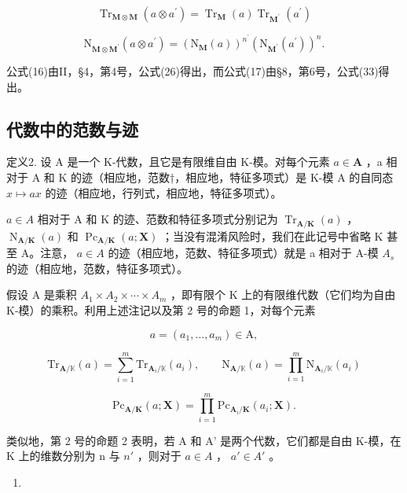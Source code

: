 \[
\operatorname{Tr} _ {\mathbf {M} \otimes \mathbf {M}} (a \otimes a ^ {\prime}) = \operatorname{Tr} _ {\mathbf {M}} (a) \operatorname{Tr} _ {\mathbf {M} ^ {\prime}} (a ^ {\prime})\tag{17}
\]

\[
\mathrm{N} _ {\mathbf {M} \otimes \mathbf {M} ^ {\prime}} (a \otimes a ^ {\prime}) = (\mathrm{N} _ {\mathbf {M}} (a)) ^ {n ^ {\prime}} (\mathrm{N} _ {\mathbf {M} ^ {\prime}} (a ^ {\prime})) ^ {n}.
\]

公式(16)由II，§4，第4号，公式(26)得出，而公式(17)由§8，第6号，公式(33)得出。

\subsection{代数中的范数与迹}

定义2. 设 A 是一个 K-代数，且它是有限维自由 K-模。对每个元素 \(a \in \mathbf{A}\) ，a 相对于 A 和 K 的迹（相应地，范数†，相应地，特征多项式）是 K-模 A 的自同态 \(x \mapsto ax\) 的迹（相应地，行列式，相应地，特征多项式）。

 \(a \in A\) 相对于 A 和 K 的迹、范数和特征多项式分别记为 \(\operatorname{Tr}_{\mathbf{A}/\mathbf{K}}(a)\) ， \(\operatorname{N}_{\mathbf{A}/\mathbf{K}}(a)\) 和 \(\operatorname{Pc}_{\mathbf{A}/\mathbf{K}}(a; \mathbf{X})\) ；当没有混淆风险时，我们在此记号中省略 K 甚至 A。注意， \(a \in A\) 的迹（相应地，范数、特征多项式）就是 a 相对于 A-模 \(A_{s}\) 的迹（相应地，范数，特征多项式）。

假设 A 是乘积 \(A_{1} \times A_{2} \times \cdots \times A_{m}\) ，即有限个 K 上的有限维代数（它们均为自由 K-模）的乘积。利用上述注记以及第 2 号的命题 1，对每个元素

\[
a = (a _ {1}, \dots , a _ {m}) \in \mathrm{A},
\]

\[
\mathrm{Tr} _ {\mathbf {A} / \mathbb {K}} (a) = \sum_ {i = 1} ^ {m} \mathrm{Tr} _ {\mathbf {A} _ {i} / \mathbb {K}} (a _ {i}), \qquad \mathrm{N} _ {\mathbf {A} / \mathbb {K}} (a) = \prod_ {i = 1} ^ {m} \mathrm{N} _ {\mathbf {A} _ {i} / \mathbb {K}} (a _ {i})\tag{18}
\]

\[
\mathrm{Pc} _ {\mathbf {A} / \mathbf {K}} (a; \mathbf {X}) = \prod_ {i = 1} ^ {m} \mathrm{Pc} _ {\mathbf {A} _ {i} / \mathbf {K}} (a _ {i}; \mathbf {X}).
\]

类似地，第 2 号的命题 2 表明，若 A 和 A' 是两个代数，它们都是自由 K-模，在 K 上的维数分别为 n 与 \(n'\) ，则对于 \(a \in A\) ， \(a' \in A'\) 。

\begin{enumerate}
\def\labelenumi{(\arabic{enumi})}
\setcounter{enumi}{18}
\tightlist
\item
\end{enumerate}

